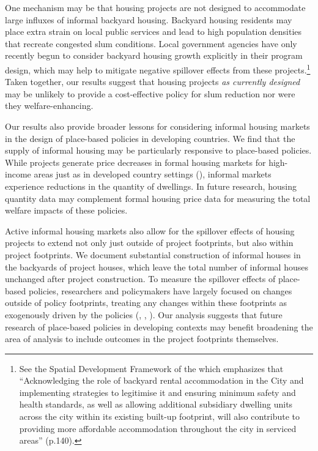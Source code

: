 \documentclass[12pt]{article}
\begin{document}
One mechanism may be that housing projects are not designed to accommodate large influxes of informal backyard housing.  Backyard housing residents may place extra strain on local public services and lead to high population densities that recreate congested slum conditions.  Local government agencies have only recently begun to consider backyard housing growth explicitly in their program design, which may help to mitigate negative spillover effects from these projects.\footnote{ See the Spatial Development Framework of the \cite{sdf} which emphasizes that ``Acknowledging the role of backyard rental accommodation in the City and implementing strategies to legitimise it and ensuring minimum safety and health standards, as well as allowing additional subsidiary dwelling units across the city within its existing built-up footprint, will also contribute to providing more affordable accommodation throughout the city in serviced areas'' (p.140).}  Taken together, our results suggest that housing projects \textit{as currently designed} may be unlikely to provide a cost-effective policy for slum reduction nor were they welfare-enhancing.

Our results also provide broader lessons for considering informal housing markets in the design of place-based policies in developing countries.  We find that the supply of informal housing may be particularly responsive to place-based policies.  While projects generate price decreases in formal housing markets for high-income areas just as in developed country settings (\cite{diamond2016wants}), informal markets experience reductions in the quantity of dwellings.  In future research, housing quantity data may complement formal housing price data for measuring the total welfare impacts of these policies.  

Active informal housing markets also allow for the spillover effects of housing projects to extend not only just outside of project footprints, but also within project footprints.  We document substantial construction of informal houses in the backyards of project houses, which leave the total number of informal houses unchanged after project construction.  To measure the spillover effects of place-based policies, researchers and policymakers have largely focused on changes outside of policy footprints, treating any changes within these footprints as exogenously driven by the policies (\cite{diamond2016wants}, \cite{rossi2010housing}, \cite{hornbeck2017creative}).  Our analysis suggests that future research of place-based policies in developing contexts may benefit broadening the area of analysis to include outcomes in the project footprints themselves.
\end{document}
